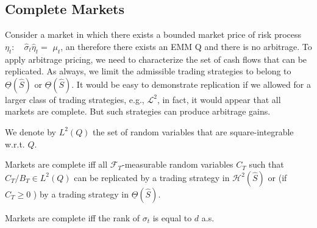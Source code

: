 \documentclass[\topdir/lecture\_notes.tex]{subfiles}
\begin{document}
\subsection{Complete Markets}
Consider a market in which there exists a bounded market price of risk process \(\eta_{t}: \quad \hat{\sigma}_{t} \hat{\eta}_{t}=\) \(\mu_{t}\), an therefore there exists an EMM Q and there is no arbitrage. To apply arbitrage pricing, we need to characterize the set of cash flows that can be replicated. As always, we limit the admissible trading strategies to belong to \(\underline{\Theta}(\hat{S})\) or \(\underline{\Theta}(\hat{S})\). It would be easy to demonstrate replication if we allowed for a larger class of trading strategies, e.g., \(\mathcal{L}^{2}\), in fact, it would appear that all markets are complete. But such strategies can produce arbitrage gains.

We denote by \(L^{2}(Q)\) the set of random variables that are square-integrable w.r.t. \(Q\).

\begin{defn}\label{def:6.2.1}
Markets are complete iff all \(\mathcal{F}_{T}\)-measurable random variables \(C_{T}\) such that \(C_{T} / B_{T} \in L^{2}(Q)\) can be replicated by a trading strategy in \(\mathcal{H}^{2}(\hat{S})\) or (if \(C_{T} \geq 0\) ) by a trading strategy in \(\underline{\Theta}(\hat{S})\).
\end{defn}

\begin{theorem}\label{thm:6.2.1}
Markets are complete iff the rank of \(\sigma_{t}\) is equal to \(d\) a.s.
\end{theorem}
\end{document}
